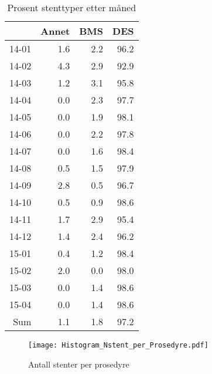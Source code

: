 \documentclass[presentation,xcolor=pdftex,dvipsnames,table]{beamer}
\begin{document}
\begin{frame}
\begin{tiny}
\begin{table}[ht]
\centering
\begin{tabular}{rrrr}
  \toprule
 & Annet & BMS & DES \\ 
  \midrule
14-01 & 1.6 & 2.2 & 96.2 \\ 
  14-02 & 4.3 & 2.9 & 92.9 \\ 
  14-03 & 1.2 & 3.1 & 95.8 \\ 
  14-04 & 0.0 & 2.3 & 97.7 \\ 
  14-05 & 0.0 & 1.9 & 98.1 \\ 
  14-06 & 0.0 & 2.2 & 97.8 \\ 
  14-07 & 0.0 & 1.6 & 98.4 \\ 
  14-08 & 0.5 & 1.5 & 97.9 \\ 
  14-09 & 2.8 & 0.5 & 96.7 \\ 
  14-10 & 0.5 & 0.9 & 98.6 \\ 
  14-11 & 1.7 & 2.9 & 95.4 \\ 
  14-12 & 1.4 & 2.4 & 96.2 \\ 
  15-01 & 0.4 & 1.2 & 98.4 \\ 
  15-02 & 2.0 & 0.0 & 98.0 \\ 
  15-03 & 0.0 & 1.4 & 98.6 \\ 
  15-04 & 0.0 & 1.4 & 98.6 \\ 
  Sum & 1.1 & 1.8 & 97.2 \\ 
   \bottomrule
\end{tabular}
\caption{Prosent stenttyper etter måned} 
\end{table}\end{tiny}
\end{frame}



\begin{frame}
\begin{figure}
  \centering
  \caption{Antall stenter per prosedyre}
  

\texttt{[image: Histogram\_Nstent\_per\_Prosedyre.pdf]}
\end{figure}
\end{frame}
\end{document}
